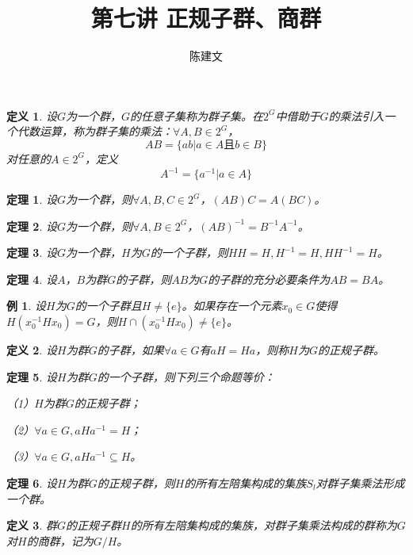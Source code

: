 \documentclass{article}
\newtheorem{Def}{定义}
\newtheorem{Thm}{定理}
\newtheorem*{Example}{例}
\begin{document}
\begin{CJK*}{UTF8}{gbsn}
  \title{第七讲 正规子群、商群}
  \author{陈建文}
  \maketitle
  

\begin{Def}
  设$G$为一个群，$G$的任意子集称为群子集。在$2^G$中借助于$G$的乘法引入一个代数运算，称为群子集的乘法：$\forall A,B\in 2^G$，
  \[AB=\{ab|a\in A \text{且} b\in B\}\]
  对任意的$A\in 2^G$，定义
\[A^{-1}=\{a^{-1}|a\in A\}\]
\end{Def}

\begin{Thm}
  设$G$为一个群，则$\forall A,B,C\in 2^G$，$(AB)C=A(BC)$。
\end{Thm}

\begin{Thm}
  设$G$为一个群，则$\forall A,B\in 2^G$，$(AB)^{-1}=B^{-1}A^{-1}$。
\end{Thm}

\begin{Thm}
  设$G$为一个群，$H$为$G$的一个子群，则$HH=H,H^{-1}=H,HH^{-1}=H$。
\end{Thm}

\begin{Thm}
设$A$，$B$为群$G$的子群，则$AB$为$G$的子群的充分必要条件为$AB=BA$。
\end{Thm}

\begin{Example}
设$H$为$G$的一个子群且$H\neq \{e\}$。如果存在一个元素$x_0\in G$使得$H(x_0^{-1}Hx_0)=G$，则$H\cap (x_0^{-1}Hx_0)\neq \{e\}$。
\end{Example}

\begin{Def}
  设$H$为群$G$的子群，如果$\forall a\in G$有$aH=Ha$，则称$H$为$G$的正规子群。
\end{Def}
\begin{Thm}
 设$H$为群$G$的一个子群，则下列三个命题等价：

 （1）$H$为群$G$的正规子群；

 （2）$\forall a\in G, aHa^{-1}=H$；

 （3）$\forall a\in G, aHa^{-1}\subseteq H$。
\end{Thm}

\begin{Thm}
设$H$为群$G$的正规子群，则$H$的所有左陪集构成的集族$S_l$对群子集乘法形成一个群。
\end{Thm}
\begin{Def}
  群$G$的正规子群$H$的所有左陪集构成的集族，对群子集乘法构成的群称为$G$对$H$的商群，记为$G/H$。
\end{Def}



\end{CJK*}
\end{document}
